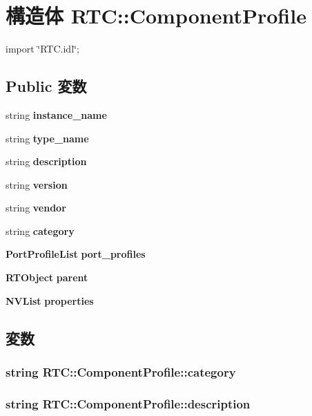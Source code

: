 \section{構造体 RTC::ComponentProfile}
\label{structRTC_1_1ComponentProfile}


{\ttfamily import \char`\"{}RTC.idl\char`\"{};}

\subsection*{Public 変数}
\begin{DoxyCompactItemize}
\item 
string {\bf instance\_\-name}
\item 
string {\bf type\_\-name}
\item 
string {\bf description}
\item 
string {\bf version}
\item 
string {\bf vendor}
\item 
string {\bf category}
\item 
{\bf PortProfileList} {\bf port\_\-profiles}
\item 
{\bf RTObject} {\bf parent}
\item 
{\bf NVList} {\bf properties}
\end{DoxyCompactItemize}


\subsection{変数}
\subsubsection[{category}]{\setlength{\rightskip}{0pt plus 5cm}string {\bf RTC::ComponentProfile::category}}\label{structRTC_1_1ComponentProfile_ac79fc17eb8db9fd42ed8e5f84f9171be}
\subsubsection[{description}]{\setlength{\rightskip}{0pt plus 5cm}string {\bf RTC::ComponentProfile::description}}\label{structRTC_1_1ComponentProfile_a874f3699d88630b493e81409071fc119}
